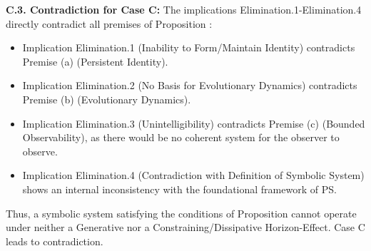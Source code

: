 \textbf{C.3. Contradiction for Case C:} The implications Elimination.1-Elimination.4 directly contradict all premises of Proposition :
\begin{itemize}
    \item Implication Elimination.1 (Inability to Form/Maintain Identity) contradicts Premise (a) (Persistent Identity).
    \item Implication Elimination.2 (No Basis for Evolutionary Dynamics) contradicts Premise (b) (Evolutionary Dynamics).
    \item Implication Elimination.3 (Unintelligibility) contradicts Premise (c) (Bounded Observability), as there would be no coherent system for the observer to observe.
    \item Implication Elimination.4 (Contradiction with Definition of Symbolic System) shows an internal inconsistency with the foundational framework of PS.
\end{itemize}
Thus, a symbolic system satisfying the conditions of Proposition  cannot operate under neither a Generative nor a Constraining/Dissipative Horizon-Effect. Case C leads to contradiction.
